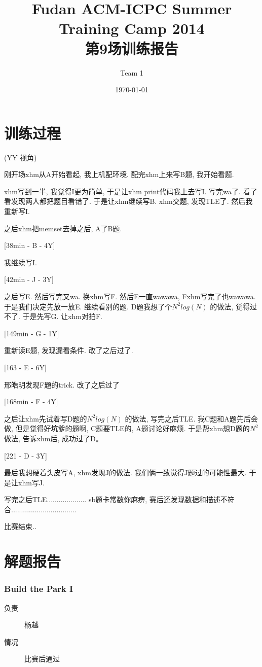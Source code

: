 \documentclass[a4paper, 11pt, nofonts, nocap, fancyhdr]{ctexart}
\title{Fudan ACM-ICPC Summer Training Camp 2014\\第9场训练报告}
\author{Team 1}
\date{\today}
\newcommand{\problem}[1]{\subsubsection{#1}}
\begin{document}
\maketitle

\section{训练过程}

(YY 视角)

刚开场xhm从A开始看起, 我上机配环境. 配完xhm上来写B题, 我开始看题.

xhm写到一半, 我觉得I更为简单, 于是让xhm print代码我上去写I. 写完wa了. 看了看发现两人都把题目看错了. 于是让xhm继续写B. xhm交题, 发现TLE了. 然后我重新写I. 

之后xhm把memset去掉之后, A了B题. 

[38min - B - 4Y]

我继续写I. 

[42min - J - 3Y]

之后写E. 然后写完又wa. 换xhm写F. 然后E一直wawawa, Fxhm写完了也wawawa. 于是我们决定先放一放E. 继续看别的题. D题我想了个$N^2log(N)$ 的做法, 觉得过不了. 于是先写G. 让xhm对拍F.

[149min - G - 1Y]

重新读E题, 发现漏看条件. 改了之后过了. 

[163 - E - 6Y]

邢皓明发现F题的trick. 改了之后过了

[168min - F - 4Y]

之后让xhm先试着写D题的$N^2log(N)$ 的做法, 写完之后TLE. 我C题和A题先后会做, 但是觉得好坑爹的题啊, C题要TLE的, A题讨论好麻烦. 于是帮xhm想D题的$N^2$做法, 告诉xhm后, 成功过了D。

[221 - D - 3Y]

最后我想硬着头皮写A, xhm发现J的做法. 我们俩一致觉得J题过的可能性最大. 于是让xhm写J.

写完之后TLE.................... sb题卡常数你麻痹, 赛后还发现数据和描述不符合.................................

比赛结束..

\section{解题报告}

\problem{Build the Park I}

\begin{description}
\item[负责] 杨越
\item[情况] 比赛后通过
\end{description}
\end{document}
